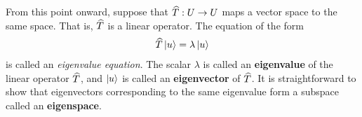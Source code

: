 \begin{comment}
There are two important subspaces associated to a linear map $\op T:U\mapsto V$. 
The {\bf kernel} of $\op T$ is the set of vectors in $U$ that are mapped to the zero vector in $V$. The {\bf image} of $\op T$ is the set of vectors in $V$ that can be written as $T(u)$ for some $u\in U$.

\begin{definition}[\bf Kernel and image]\leavevmode
	\begin{align}
		\ker \op T &= \{u\in U|\op T(u) = 0\} \\
		\textrm{Im} \op T &= \{v\in V|\op T(u)=v\}
	\end{align}
\end{definition}

The kernel and the image are subspaces of $U$ and $V$ respectively. (Prove this.) Furthermore, even though they are subspaces of different vector spaces, we have the follow theorem, which we do not prove here.

\begin{theorem}[\bf Rank-nullity]\leavevmode
	\begin{align}
		\dim \ker \op T + \dim \textrm{Im} \op T = \dim U
	\end{align}
\end{theorem}

One can see that a linear map is invertible iff the kernel is trivial, $\ker \op T = \{0\}$.


$$[AB,CD] = [A,C]BD + A[B,C]D+ C[A,D]B + CA[B,D]$$
\end{comment}



From this point onward, suppose that $\widehat{T}: U\to U$ maps a vector space to the same space. That is, $\widehat{T}$ is a linear operator.
The equation of the form
\begin{align}
	\widehat{T}\ket{u} = \lambda \ket{u}
\end{align}
is called an \emph{eigenvalue equation}. The scalar $\lambda$ is called an {\bf eigenvalue} of the linear operator $\widehat{T}$, and $\ket{u}$ is called an {\bf eigenvector} of $\widehat{T}$. It is straightforward to show that eigenvectors corresponding to the same eigenvalue form a subspace called an {\bf eigenspace}.

